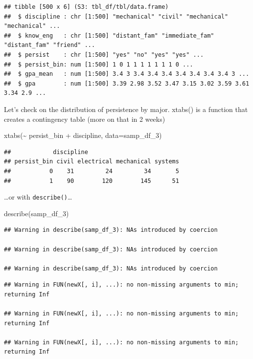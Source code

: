 \documentclass[
]{book}
\newenvironment{Shaded}{\begin{snugshade}}{\end{snugshade}}
\newcommand{\AttributeTok}[1]{\textcolor[rgb]{0.77,0.63,0.00}{#1}}
\newcommand{\FunctionTok}[1]{\textcolor[rgb]{0.00,0.00,0.00}{#1}}
\newcommand{\NormalTok}[1]{#1}
\newcommand{\SpecialCharTok}[1]{\textcolor[rgb]{0.00,0.00,0.00}{#1}}
\begin{document}
\begin{verbatim}
## tibble [500 x 6] (S3: tbl_df/tbl/data.frame)
##  $ discipline : chr [1:500] "mechanical" "civil" "mechanical" "mechanical" ...
##  $ know_eng   : chr [1:500] "distant_fam" "immediate_fam" "distant_fam" "friend" ...
##  $ persist    : chr [1:500] "yes" "no" "yes" "yes" ...
##  $ persist_bin: num [1:500] 1 0 1 1 1 1 1 1 1 0 ...
##  $ gpa_mean   : num [1:500] 3.4 3 3.4 3.4 3.4 3.4 3.4 3.4 3.4 3 ...
##  $ gpa        : num [1:500] 3.39 2.98 3.52 3.47 3.15 3.02 3.59 3.61 3.34 2.9 ...
\end{verbatim}

Let's check on the distribution of persistence by major. xtabs() is a function that creates a contingency table (more on that in 2 weeks)

\begin{Shaded}
\begin{Highlighting}[]
\FunctionTok{xtabs}\NormalTok{(}\SpecialCharTok{\textasciitilde{}}\NormalTok{ persist\_bin }\SpecialCharTok{+}\NormalTok{ discipline, }\AttributeTok{data=}\NormalTok{samp\_df\_3)}
\end{Highlighting}
\end{Shaded}

\begin{verbatim}
##            discipline
## persist_bin civil electrical mechanical systems
##           0    31         24         34       5
##           1    90        120        145      51
\end{verbatim}

\ldots or with \texttt{describe()}\ldots{}

\begin{Shaded}
\begin{Highlighting}[]
\FunctionTok{describe}\NormalTok{(samp\_df\_3)}
\end{Highlighting}
\end{Shaded}

\begin{verbatim}
## Warning in describe(samp_df_3): NAs introduced by coercion

## Warning in describe(samp_df_3): NAs introduced by coercion

## Warning in describe(samp_df_3): NAs introduced by coercion
\end{verbatim}

\begin{verbatim}
## Warning in FUN(newX[, i], ...): no non-missing arguments to min; returning Inf

## Warning in FUN(newX[, i], ...): no non-missing arguments to min; returning Inf

## Warning in FUN(newX[, i], ...): no non-missing arguments to min; returning Inf
\end{verbatim}
\end{document}
